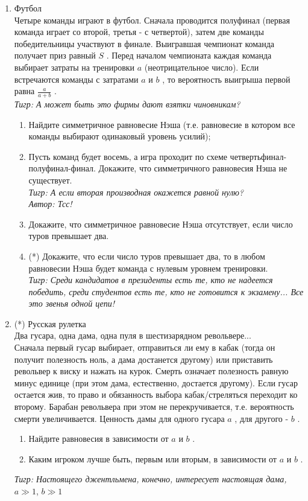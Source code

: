 \documentclass[pdftex,12pt,a4paper]{article}
\begin{document}
\begin{enumerate}
\item Футбол\\
Четыре команды играют в футбол. Сначала проводится полуфинал (первая команда играет со второй, третья - с четвертой), затем две команды победительницы участвуют в финале. Выигравшая чемпионат команда получает приз равный  $S$ . Перед началом чемпионата каждая команда выбирает затраты на тренировки  $a$  (неотрицательное число). Если встречаются команды с затратами  $a$  и  $b$ , то вероятность выигрыша первой равна  $\frac{a}{a+b} $ .\\
{\it Тигр: А может быть это фирмы дают взятки чиновникам?}
\begin{enumerate}
\item Найдите симметричное  равновесие  Нэша (т.е. равновесие в котором все команды выбирают одинаковый уровень усилий);
\item Пусть команд будет восемь, а игра проходит по схеме четвертьфинал-полуфинал-финал. Докажите, что симметричного равновесия Нэша не существует.\\
{\it Тигр: А если вторая производная  окажется равной нулю?}\\
{\it  Автор: Тсс!}
\item Докажите, что симметричное равновесие Нэша отсутствует, если число туров превышает два.
\item (*) Докажите, что если число туров превышает два, то в любом равновесии Нэша будет команда с нулевым уровнем тренировки.\\
{\it Тигр: Среди кандидатов в президенты есть те, кто не надеется победить, среди студентов есть те, кто не готовится к экзамену... Все это звенья одной цепи!}
\end{enumerate}

\item (*) Русская рулетка \\
Два гусара, одна дама, одна пуля в шестизарядном револьвере...\\
Сначала первый гусар выбирает, отправиться ли ему в кабак (тогда он получит полезность ноль, а дама достанется другому) или приставить револьвер к виску и нажать на курок. Смерть означает полезность равную минус единице (при этом дама, естественно, достается другому). Если гусар остается жив, то право и обязанность выбора кабак/стреляться переходит ко второму. Барабан револьвера при этом не перекручивается, т.е. вероятность смерти увеличивается. Ценность дамы для одного гусара  $a$ , для другого -  $b$ .
\begin{enumerate}
\item Найдите равновесия в зависимости от  $a$  и  $b$ .
\item Каким игроком лучше быть, первым или вторым, в зависимости от   $a$  и  $b$ .
\end{enumerate}
{\it Тигр: Настоящего джентльмена, конечно, интересует настоящая дама, } $a\gg 1$, $b\gg 1$ 


\end{enumerate}
\end{document}
